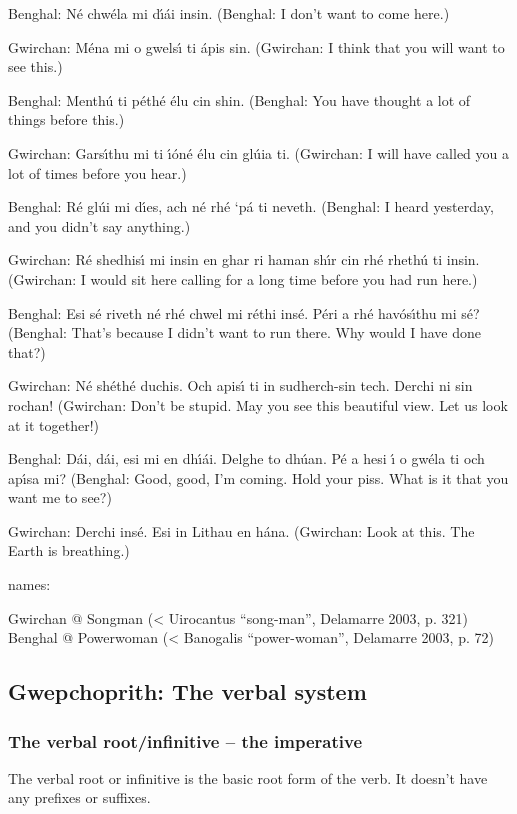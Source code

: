 Benghal: N\'{e} chw\'{e}la mi d\'{\i}\'{a}i insin.
(Benghal: I don't want to come here.)

Gwirchan: M\'{e}na mi o gwels\'{\i} ti \'{a}pis sin.
(Gwirchan: I think that you will want to see this.)

Benghal: Menth\'{u} ti p\'{e}th\'{e} \'{e}lu cin shin.
(Benghal: You have thought a lot of things before this.)

Gwirchan: Gars\'{\i}thu mi ti \'{\i}\'{o}n\'{e} \'{e}lu cin gl\'{u}ia ti.
(Gwirchan: I will have called you a lot of times before you hear.)

Benghal: R\'{e} gl\'{u}i mi d\'{\i}es, ach n\'{e} rh\'{e} ‘p\'{a} ti neveth.
(Benghal: I heard yesterday, and you didn’t say anything.)

Gwirchan: R\'{e} shedhis\'{\i} mi insin en ghar ri haman sh\'{\i}r cin rh\'{e} rheth\'{u} ti insin.
(Gwirchan: I would sit here calling for a long time before you had run here.)

Benghal: Esi s\'{e} riveth n\'{e} rh\'{e} chwel mi r\'{e}thi ins\'{e}. P\'{e}ri a rh\'{e} hav\'{o}s\'{\i}thu mi s\'{e}?
(Benghal: That’s because I didn’t want to run there. Why would I have done that?)

Gwirchan: N\'{e} sh\'{e}th\'{e} duchis. Och apis\'{\i} ti in sudherch-sin tech. Derchi ni sin rochan!
(Gwirchan: Don't be stupid. May you see this beautiful view. Let us look at it together!)

Benghal: D\'{a}i, d\'{a}i, esi mi en dh\'{\i}\'{a}i. Delghe to dh\'{u}an. P\'{e} a hesi \'{\i} o gw\'{e}la ti och ap\'{\i}sa mi?
(Benghal: Good, good, I'm coming. Hold your piss. What is it that you want me to see?)

Gwirchan: Derchi ins\'{e}. Esi in Lithau en h\'{a}na.
(Gwirchan: Look at this. The Earth is breathing.)

names: 

Gwirchan @ Songman (< Uirocantus ``song-man'', Delamarre 2003, p. 321)
Benghal @ Powerwoman (< Banogalis ``power-woman'', Delamarre 2003, p. 72)

\subsection{Gwepchoprith: The verbal system}
\subsubsection{The verbal root/infinitive – the imperative}

The verbal root or infinitive is the basic root form of the verb. It doesn't have any prefixes or suffixes. 

